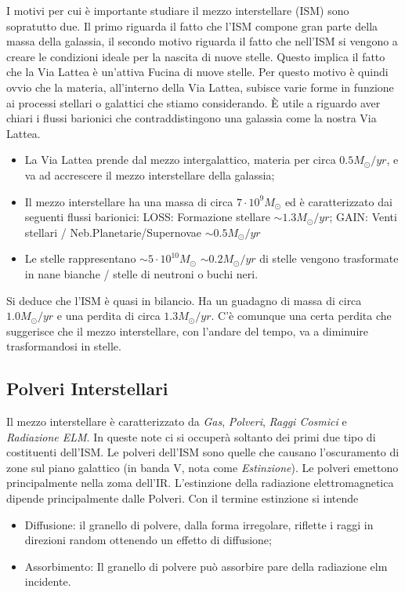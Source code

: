 I motivi per cui \`e importante studiare il mezzo interstellare (ISM) sono sopratutto due. Il primo riguarda il fatto che l'ISM compone gran parte della massa della galassia, il secondo motivo riguarda il fatto che nell'ISM si vengono a creare le condizioni ideale per la nascita di nuove stelle.
Questo implica il fatto che la Via Lattea \`e un'attiva Fucina di nuove stelle. Per questo motivo \`e quindi ovvio che la materia, all'interno della Via Lattea, subisce varie forme in funzione ai processi stellari o galattici che stiamo considerando. \`E utile a riguardo aver chiari i flussi barionici che contraddistingono una galassia come la nostra Via Lattea.
\begin{itemize}
		\item La Via Lattea prende dal mezzo intergalattico, materia per circa $0.5 M_{\odot}/yr$, e va ad accrescere il mezzo interstellare della galassia;
		\item Il mezzo interstellare ha una massa di circa $7\cdot 10^9 M_{\odot}$ ed \`e caratterizzato dai seguenti flussi barionici:
				\subitem LOSS: Formazione stellare $\sim 1.3 M_{\odot}/yr$;
				\subitem GAIN: Venti stellari / Neb.Planetarie/Supernovae $\sim 0.5 M_{\odot}/yr$
		\item Le stelle rappresentano $\sim 5\cdot 10^{10}M_{\odot}$
				\subitem $\sim 0.2 M_{\odot}/yr$ di stelle vengono trasformate in nane bianche / stelle di neutroni o buchi neri.
\end{itemize}
Si deduce che l'ISM \`e quasi in bilancio. Ha un guadagno di massa di circa $1.0 M_{\odot}/yr$ e una perdita di circa $1.3 M_{\odot}/yr$. C'\`e comunque una certa perdita che suggerisce che il mezzo interstellare, con l'andare del tempo, va a diminuire trasformandosi in stelle.
\subsection{Polveri Interstellari}
Il mezzo interstellare \`e caratterizzato da \emph{Gas}, \emph{Polveri}, \emph{Raggi Cosmici} e \emph{Radiazione ELM}. In queste note ci si occuper\`a soltanto dei primi due tipo di costituenti dell'ISM. Le polveri dell'ISM sono quelle che causano l'oscuramento di zone sul piano galattico (in banda V, nota come \emph{Estinzione}). Le polveri emettono principalmente nella zoma dell'IR. L'estinzione della radiazione elettromagnetica dipende principalmente dalle Polveri. Con il termine estinzione si intende
\begin{itemize}
		\item Diffusione: il granello di polvere, dalla forma irregolare, riflette i raggi in direzioni random ottenendo un effetto di diffusione;
		\item Assorbimento: Il granello di polvere pu\`o assorbire pare della radiazione elm incidente.
\end{itemize}

